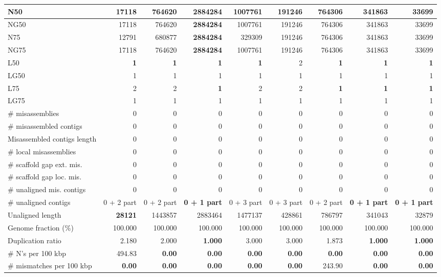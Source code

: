 \documentclass[12pt,a4paper]{article}
\begin{document}
\begin{table}[ht]
\begin{center}
\begin{tabular}{|l*{8}{|r}|}
N50 & 17118 & 764620 & {\bf 2884284} & 1007761 & 191246 & 764306 & 341863 & 33699 \\ \hline
NG50 & 17118 & 764620 & {\bf 2884284} & 1007761 & 191246 & 764306 & 341863 & 33699 \\ \hline
N75 & 12791 & 680877 & {\bf 2884284} & 329309 & 191246 & 764306 & 341863 & 33699 \\ \hline
NG75 & 17118 & 764620 & {\bf 2884284} & 1007761 & 191246 & 764306 & 341863 & 33699 \\ \hline
L50 & {\bf 1} & {\bf 1} & {\bf 1} & {\bf 1} & 2 & {\bf 1} & {\bf 1} & {\bf 1} \\ \hline
LG50 & 1 & 1 & 1 & 1 & 1 & 1 & 1 & 1 \\ \hline
L75 & 2 & 2 & {\bf 1} & 2 & 2 & {\bf 1} & {\bf 1} & {\bf 1} \\ \hline
LG75 & 1 & 1 & 1 & 1 & 1 & 1 & 1 & 1 \\ \hline
\# misassemblies & 0 & 0 & 0 & 0 & 0 & 0 & 0 & 0 \\ \hline
\# misassembled contigs & 0 & 0 & 0 & 0 & 0 & 0 & 0 & 0 \\ \hline
Misassembled contigs length & 0 & 0 & 0 & 0 & 0 & 0 & 0 & 0 \\ \hline
\# local misassemblies & 0 & 0 & 0 & 0 & 0 & 0 & 0 & 0 \\ \hline
\# scaffold gap ext. mis. & 0 & 0 & 0 & 0 & 0 & 0 & 0 & 0 \\ \hline
\# scaffold gap loc. mis. & 0 & 0 & 0 & 0 & 0 & 0 & 0 & 0 \\ \hline
\# unaligned mis. contigs & 0 & 0 & 0 & 0 & 0 & 0 & 0 & 0 \\ \hline
\# unaligned contigs & 0 + 2 part & 0 + 2 part & {\bf 0 + 1 part} & 0 + 3 part & 0 + 3 part & 0 + 2 part & {\bf 0 + 1 part} & {\bf 0 + 1 part} \\ \hline
Unaligned length & {\bf 28121} & 1443857 & 2883464 & 1477137 & 428861 & 786797 & 341043 & 32879 \\ \hline
Genome fraction (\%) & 100.000 & 100.000 & 100.000 & 100.000 & 100.000 & 100.000 & 100.000 & 100.000 \\ \hline
Duplication ratio & 2.180 & 2.000 & {\bf 1.000} & 3.000 & 3.000 & 1.873 & {\bf 1.000} & {\bf 1.000} \\ \hline
\# N's per 100 kbp & 494.83 & {\bf 0.00} & {\bf 0.00} & {\bf 0.00} & {\bf 0.00} & {\bf 0.00} & {\bf 0.00} & {\bf 0.00} \\ \hline
\# mismatches per 100 kbp & {\bf 0.00} & {\bf 0.00} & {\bf 0.00} & {\bf 0.00} & {\bf 0.00} & 243.90 & {\bf 0.00} & {\bf 0.00} \\ \hline

\end{tabular}
\end{center}
\end{table}
\end{document}
